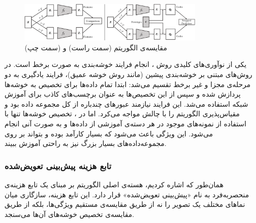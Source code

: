 \begin{figure}[htb!]
\centering
\includegraphics[width=0.8\textwidth]{Images/Chapter3/swav-comparison.png}
\caption{مقایسه‌ی الگوریتم  (سمت راست) و  (سمت چپ)}
\label{fig:wavelet-plot}
\end{figure}

یکی از نوآوری‌های کلیدی روش ، انجام فرایند خوشه‌بندی به صورت برخط
است. در روش‌های مبتنی بر خوشه‌بندی پیشین
(مانند روش خوشه عمیق\cite{caron2018deep})،
فرایند یادگیری به دو مرحله‌ی مجزا و غیر برخط تقسیم می‌شد: ابتدا تمام داده‌ها برای تخصیص به خوشه‌ها پردازش شده و سپس از این تخصیص‌ها به عنوان برچسب‌های کاذب برای آموزش شبکه استفاده می‌شد.  این فرایند نیازمند عبورهای چندباره از کل مجموعه داده بود و مقیاس‌پذیری الگوریتم را با چالش مواجه می‌کرد. اما در ، تخصیص خوشه‌ها تنها با استفاده از نمونه‌های موجود در هر دسته‌ی آموزشی از داده‌ها و به صورت آنی انجام می‌شود. این ویژگی باعث می‌شود که  بسیار کارآمد بوده و بتواند بر روی مجموعه‌داده‌های بسیار بزرگ نیز به راحتی آموزش ببیند.

\subsubsection{تابع هزینه پیش‌بینی تعویض‌شده}

همان‌طور که اشاره کردیم، هسته‌ی اصلی الگوریتم  بر مبنای یک تابع هزینه‌ی منحصربه‌فرد به نام «پیش‌بینی تعویض‌شده» قرار دارد. این تابع هزینه، سازگاری میان نماهای مختلف یک تصویر را نه از طریق مقایسه‌ی مستقیم ویژگی‌ها، بلکه از طریق مقایسه‌ی تخصیص خوشه‌های آن‌ها می‌سنجد.

